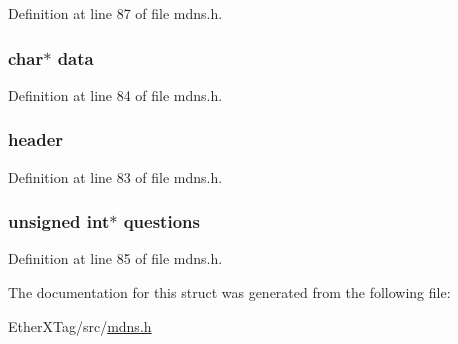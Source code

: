 Definition at line 87 of file mdns.\-h.

\hypertarget{structdns__packet__t_a91a70b77df95bd8b0830b49a094c2acb}{
\subsubsection[{data}]{\setlength{\rightskip}{0pt plus 5cm}char$\ast$ data}}\label{structdns__packet__t_a91a70b77df95bd8b0830b49a094c2acb}


Definition at line 84 of file mdns.\-h.

\hypertarget{structdns__packet__t_ae40246d3fea48323550a8957db1bd5c1}{
\subsubsection[{header}]{ header}}\label{structdns__packet__t_ae40246d3fea48323550a8957db1bd5c1}


Definition at line 83 of file mdns.\-h.

\hypertarget{structdns__packet__t_a8053eea6cc5a03a184473df63560d978}{
\subsubsection[{questions}]{\setlength{\rightskip}{0pt plus 5cm}unsigned int$\ast$ questions}}\label{structdns__packet__t_a8053eea6cc5a03a184473df63560d978}


Definition at line 85 of file mdns.\-h.



The documentation for this struct was generated from the following file\-:\begin{DoxyCompactItemize}
\item 
Ether\-X\-Tag/src/\hyperlink{mdns_8h}{mdns.\-h}\end{DoxyCompactItemize}
